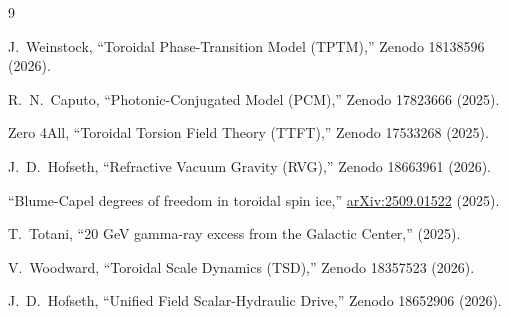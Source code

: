 \documentclass[12pt,a4paper]{article}
\newcommand{\arXiv}[1]{\href{https://arxiv.org/abs/#1}{arXiv:#1}}
\begin{document}
\begin{thebibliography}{9}

J.~Weinstock, ``Toroidal Phase-Transition Model (TPTM),'' Zenodo 18138596 (2026).

R.~N.~Caputo, ``Photonic-Conjugated Model (PCM),'' Zenodo 17823666 (2025).

Zero 4All, ``Toroidal Torsion Field Theory (TTFT),'' Zenodo 17533268 (2025).

J.~D.~Hofseth, ``Refractive Vacuum Gravity (RVG),'' Zenodo 18663961 (2026).

``Blume-Capel degrees of freedom in toroidal spin ice,'' \arXiv{2509.01522} (2025).

T.~Totani, ``20 GeV gamma-ray excess from the Galactic Center,'' (2025).

V.~Woodward, ``Toroidal Scale Dynamics (TSD),'' Zenodo 18357523 (2026).

J.~D.~Hofseth, ``Unified Field Scalar-Hydraulic Drive,'' Zenodo 18652906 (2026).

\end{thebibliography}
\end{document}
